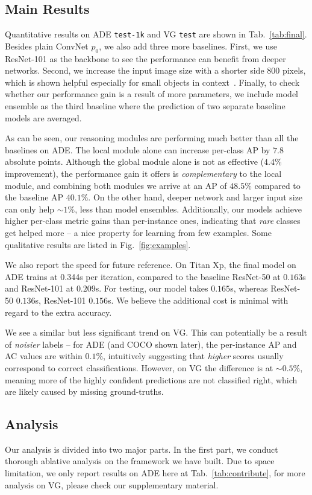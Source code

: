 \documentclass[10pt,twocolumn,letterpaper]{article}
\begin{document}
\subsection{Main Results\label{results}}
Quantitative results on ADE {\tt test-1k} and VG {\tt test} are shown in Tab.~\ref{tab:final}. Besides plain ConvNet $p_0$, we also add three more baselines. First, we use ResNet-101 as the backbone to see the performance can benefit from deeper networks. Second, we increase the input image size with a shorter side $800$ pixels, which is shown helpful especially for small objects in context~\cite{lin2016feature}. Finally, to check whether our performance gain is a result of more parameters, we include model ensemble as the third baseline where the prediction of two separate baseline models are averaged.

As can be seen, our reasoning modules are performing much better than all the baselines on ADE. The local module alone can increase per-class AP by $7.8$ absolute points. Although the global module alone is not as effective ($4.4\%$ improvement), the performance gain it offers is \emph{complementary} to the local module, and combining both modules we arrive at an AP of $48.5\%$ compared to the baseline AP $40.1\%$. On the other hand, deeper network and larger input size can only help ${\sim}1\%$, less than model ensembles. Additionally, our models achieve higher per-class metric gains than per-instance ones, indicating that \emph{rare} classes get helped more -- a nice property for learning from few examples. Some qualitative results are listed in Fig.~\ref{fig:examples}. 

We also report the speed for future reference. On Titan Xp, the final model on ADE trains at 0.344s per iteration, compared to the baseline ResNet-50 at $0.163$s and ResNet-101 at $0.209$s. For testing, our model takes $0.165$s, whereas ResNet-50 $0.136$s, ResNet-101 $0.156$s. We believe the additional
cost is minimal with regard to the extra accuracy.

We see a similar but less significant trend on VG. This can potentially be a result of \emph{noisier} labels -- for ADE (and COCO shown later), the per-instance AP and AC values are within $0.1\%$, intuitively suggesting that \emph{higher} scores usually correspond to correct classifications. However, on VG the difference is at ${\sim}0.5\%$, meaning more of the highly confident predictions are not classified right, which are likely caused by missing ground-truths. 

\subsection{Analysis\label{ablative}}
Our analysis is divided into two major parts. In the first part, we conduct thorough ablative analysis on the framework we have built. Due to space limitation, we only report results on ADE here at Tab.~\ref{tab:contribute}, for more analysis on VG, please check our supplementary material. 
\end{document}
